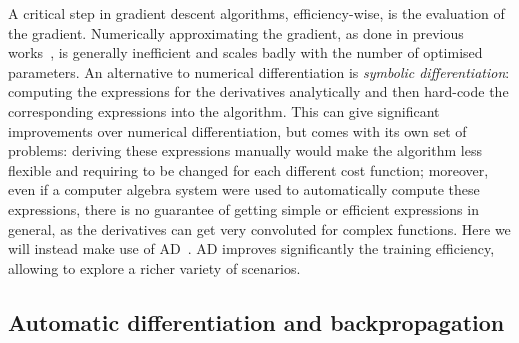 A critical step in gradient descent algorithms, efficiency-wise, is the evaluation of the gradient.
Numerically approximating the gradient, as done in previous works~\cite{banchi2016quantum}, is generally inefficient and scales badly with the number of optimised parameters.
An alternative to numerical differentiation is \emph{symbolic differentiation}: computing the expressions for the derivatives analytically and then hard-code the corresponding expressions into the algorithm. This can give significant improvements over numerical differentiation, but comes with its own set of problems: deriving these expressions manually would make the algorithm less flexible and requiring to be changed for each different cost function; moreover, even if a computer algebra system were used to automatically compute these expressions, there is no guarantee of getting simple or efficient expressions in general, as the derivatives can get very convoluted for complex functions.
Here we will instead make use of \acf{AD}~\cite{bartholomewbiggs2000automatic,bischof2008advances,baydin2018automatic}.
\ac{AD} improves significantly the training efficiency, allowing to explore a richer variety of scenarios.



\subsection{Automatic differentiation and backpropagation}
\label{subsec:GL:backpropagation}

